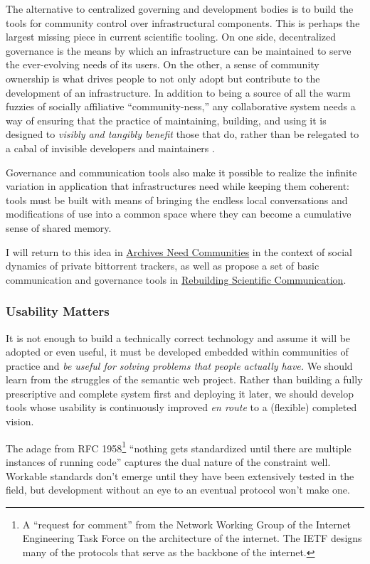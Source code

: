 \documentclass[10pt]{article}
\begin{document}
\begin{multicols}{2}
The alternative to centralized governing and development bodies is to
build the tools for community control over infrastructural components.
This is perhaps the largest missing piece in current scientific tooling.
On one side, decentralized governance is the means by which an
infrastructure can be maintained to serve the ever-evolving needs of its
users. On the other, a sense of community ownership is what drives
people to not only adopt but contribute to the development of an
infrastructure. In addition to being a source of all the warm fuzzies of
socially affiliative ``community-ness,'' any collaborative system needs
a way of ensuring that the practice of maintaining, building, and using
it is designed to \emph{visibly and tangibly benefit} those that do,
rather than be relegated to a cabal of invisible developers and
maintainers \cite{grudinGroupwareSocialDynamics1994, randallDistributedOntologyBuilding2011} .

Governance and communication tools also make it possible to realize the
infinite variation in application that infrastructures need while
keeping them coherent: tools must be built with means of bringing the
endless local conversations and modifications of use into a common space
where they can become a cumulative sense of shared memory.

I will return to this idea in
\protect\hyperlink{archives-need-communities}{Archives Need Communities}
in the context of social dynamics of private bittorrent trackers, as
well as propose a set of basic communication and governance tools in
\protect\hyperlink{rebuilding-scientific-communication}{Rebuilding
Scientific Communication}.

\hypertarget{usability-matters}{%
\subsubsection{Usability Matters}\label{usability-matters}}

It is not enough to build a technically correct technology and assume it
will be adopted or even useful, it must be developed embedded within
communities of practice and \emph{be useful for solving problems that
people actually have.} We should learn from the struggles of the
semantic web project. Rather than building a fully prescriptive and
complete system first and deploying it later, we should develop tools
whose usability is continuously improved \emph{en route} to a (flexible)
completed vision.

The adage from RFC 1958\footnote{A ``request for comment'' from the
  Network Working Group of the Internet Engineering Task Force on the
  architecture of the internet. The IETF designs many of the protocols
  that serve as the backbone of the internet.} ``nothing gets
standardized until there are multiple instances of running code'' \cite{carpenterRFC1958Architectural1996}  captures the dual nature of
the constraint well. Workable standards don't emerge until they have
been extensively tested in the field, but development without an eye to
an eventual protocol won't make one.


\end{multicols}
\end{document}
